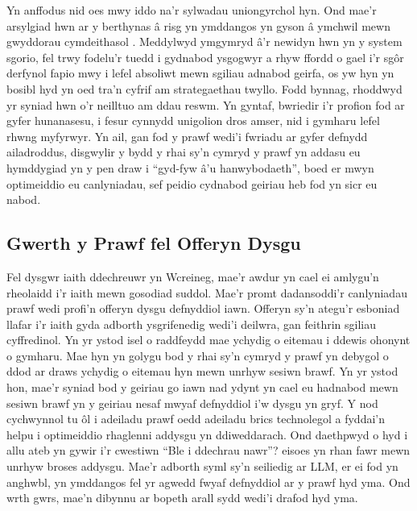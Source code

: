 Yn anffodus nid oes mwy iddo na'r sylwadau uniongyrchol hyn. Ond mae'r arsylgiad hwn ar y berthynas â risg yn ymddangos yn gyson â ymchwil mewn gwyddorau cymdeithasol \parencite{wang_does_2023}. Meddylwyd ymgymryd â'r newidyn hwn yn y system sgorio, fel trwy fodelu'r tuedd i gydnabod ysgogwyr a rhyw ffordd o gael i'r sgôr derfynol fapio mwy i lefel absoliwt mewn sgiliau adnabod geirfa, os yw hyn yn bosibl hyd yn oed tra'n cyfrif am strategaethau twyllo. Fodd bynnag, rhoddwyd yr syniad hwn o'r neilltuo am ddau reswm. Yn gyntaf, bwriedir i'r profion fod ar gyfer hunanasesu, i fesur cynnydd unigolion dros amser, nid i gymharu lefel rhwng myfyrwyr. Yn ail, gan fod y prawf wedi'i fwriadu ar gyfer defnydd ailadroddus, disgwylir y bydd y rhai sy'n cymryd y prawf yn addasu eu hymddygiad yn y pen draw i ``gyd-fyw â'u hanwybodaeth'', boed er mwyn optimeiddio eu canlyniadau, sef peidio cydnabod geiriau heb fod yn sicr eu nabod.

\subsection{Gwerth y Prawf fel Offeryn Dysgu}
Fel dysgwr iaith ddechreuwr yn Wcreineg, mae'r awdur yn cael ei amlygu'n rheolaidd i'r iaith mewn gosodiad suddol. Mae'r promt dadansoddi'r canlyniadau prawf wedi profi'n offeryn dysgu defnyddiol iawn. Offeryn sy'n ategu'r esboniad llafar i'r iaith gyda adborth ysgrifenedig wedi'i deilwra, gan feithrin sgiliau cyffredinol. Yn yr ystod isel o raddfeydd mae ychydig o eitemau i ddewis ohonynt o gymharu. Mae hyn yn golygu bod y rhai sy'n cymryd y prawf yn debygol o ddod ar draws ychydig o eitemau hyn mewn unrhyw sesiwn brawf. Yn yr ystod hon, mae'r syniad bod y geiriau go iawn nad ydynt yn cael eu hadnabod mewn sesiwn brawf yn y geiriau nesaf mwyaf defnyddiol i'w dysgu yn gryf. Y nod cychwynnol tu ôl i adeiladu prawf oedd adeiladu brics technolegol a fyddai'n helpu i optimeiddio rhaglenni addysgu yn ddiweddarach. Ond daethpwyd o hyd i allu ateb yn gywir i'r cwestiwn ``Ble i ddechrau nawr''? eisoes yn rhan fawr mewn unrhyw broses addysgu. Mae'r adborth syml sy'n seiliedig ar LLM, er ei fod yn anghwbl, yn ymddangos fel yr agwedd fwyaf defnyddiol ar y prawf hyd yma. Ond wrth gwrs, mae'n dibynnu ar bopeth arall sydd wedi'i drafod hyd yma.

